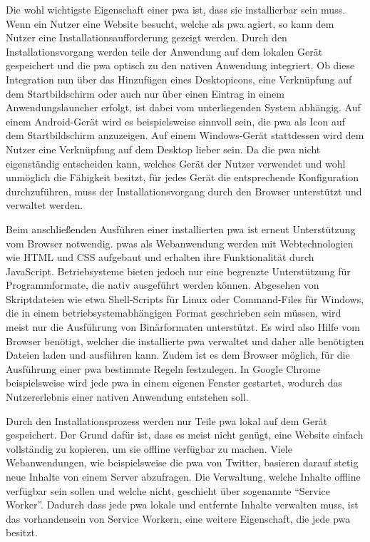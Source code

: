 \documentclass[12pt, parskip=half]{scrartcl}       %
\begin{document}
Die wohl wichtigste Eigenschaft einer \ac{pwa} ist, dass sie installierbar sein muss.
Wenn ein Nutzer eine Website besucht, welche als \ac{pwa} agiert, so kann dem Nutzer eine Installationsaufforderung gezeigt werden.
Durch den Installationsvorgang werden teile der Anwendung auf dem lokalen Gerät gespeichert und die \ac{pwa} optisch zu den nativen Anwendung integriert.
Ob diese Integration nun über das Hinzufügen eines Desktopicons, eine Verknüpfung auf dem Startbildschirm oder auch nur über einen Eintrag in einem Anwendungslauncher erfolgt, ist dabei vom unterliegenden System abhängig.
Auf einem Android-Gerät wird es beispielsweise sinnvoll sein, die \ac{pwa} als Icon auf dem Startbildschirm anzuzeigen.
Auf einem Windows-Gerät stattdessen wird dem Nutzer eine Verknüpfung auf dem Desktop lieber sein.
Da die \ac{pwa} nicht eigenständig entscheiden kann, welches Gerät der Nutzer verwendet und wohl unmöglich die Fähigkeit besitzt, für jedes Gerät die entsprechende Konfiguration durchzuführen, muss der Installationsvorgang durch den Browser unterstützt und verwaltet werden.

Beim anschließenden Ausführen einer installierten \ac{pwa} ist erneut Unterstützung vom Browser notwendig.
\acp{pwa} als Webanwendung werden mit Webtechnologien wie HTML und CSS aufgebaut und erhalten ihre Funktionalität durch JavaScript.
Betriebsysteme bieten jedoch nur eine begrenzte Unterstützung für Programmformate, die nativ ausgeführt werden können.
Abgesehen von Skriptdateien wie etwa Shell-Scripts für Linux oder Command-Files für Windows, die in einem betriebsystemabhängigen Format geschrieben sein müssen, wird meist nur die Ausführung von Binärformaten unterstützt\cite{fisher_executablelist}.
Es wird also Hilfe vom Browser benötigt, welcher die installierte \ac{pwa} verwaltet und daher alle benötigten Dateien laden und ausführen kann.
Zudem ist es dem Browser möglich, für die Ausführung einer \ac{pwa} bestimmte Regeln festzulegen.
In Google Chrome beispielsweise wird jede \ac{pwa} in einem eigenen Fenster gestartet, wodurch das Nutzererlebnis einer nativen Anwendung entstehen soll\cite{googledevs_pwa}.


Durch den Installationsprozess werden nur Teile \ac{pwa} lokal auf dem Gerät gespeichert.
Der Grund dafür ist, dass es meist nicht genügt, eine Website einfach vollständig zu kopieren, um sie offline verfügbar zu machen.
Viele Webanwendungen, wie beispielsweise die \ac{pwa} von Twitter\cite{twitter_pwa}, basieren darauf stetig neue Inhalte von einem Server abzufragen.
Die Verwaltung, welche Inhalte offline verfügbar sein sollen und welche nicht, geschieht über sogenannte \enquote{Service Worker}.
Dadurch dass jede \ac{pwa} lokale und entfernte Inhalte verwalten muss, ist das vorhandensein von Service Workern, eine weitere Eigenschaft, die jede \ac{pwa} besitzt.
\end{document}
